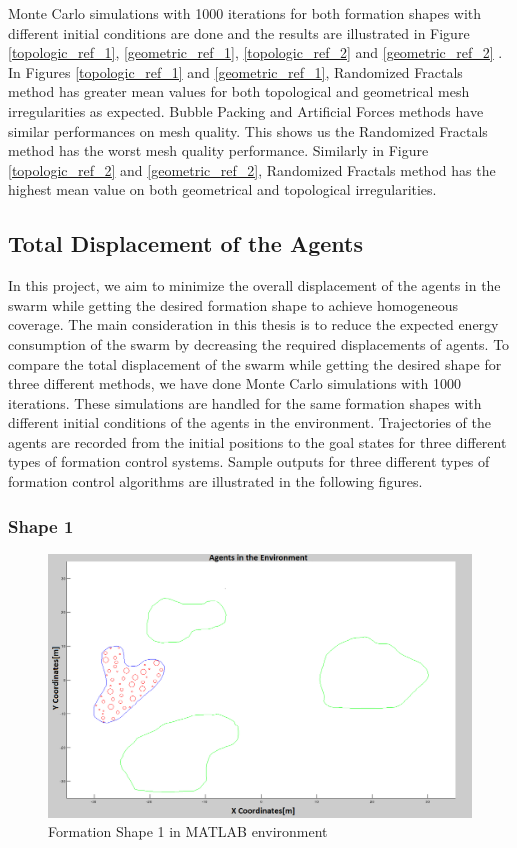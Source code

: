 Monte Carlo simulations with 1000 iterations for both formation shapes with different initial conditions are done and the results are illustrated in Figure \ref{topologic_ref_1}, \ref{geometric_ref_1}, \ref{topologic_ref_2} and \ref{geometric_ref_2} . In Figures \ref{topologic_ref_1} and \ref{geometric_ref_1}, Randomized Fractals method has greater mean values for both topological and geometrical mesh irregularities as expected.  Bubble Packing and Artificial Forces methods have similar performances on mesh quality. This shows us the Randomized Fractals method has the worst mesh quality performance. Similarly in Figure \ref{topologic_ref_2} and \ref{geometric_ref_2}, Randomized Fractals method has the highest mean value on both geometrical and topological irregularities.
		
\subsection{Total Displacement of the Agents}  \label{total_dist_ref}
		
In this project, we aim to minimize the overall displacement of the agents in the swarm while getting the desired formation shape to achieve homogeneous coverage. The main consideration in this thesis is to reduce the expected energy consumption of the swarm by decreasing the required displacements of agents. To compare the total displacement of the swarm while getting the desired shape for three different methods, we have done Monte Carlo simulations with 1000 iterations. These simulations are handled for the same formation shapes with different initial conditions of the agents in the environment. Trajectories of the agents are recorded from the initial positions to the goal states for three different types of formation control systems. Sample outputs for three different types of formation control algorithms are illustrated in the following figures.		

\subsubsection{Shape 1}\hspace{0pt}
		
\begin{figure}[H]
\caption{Formation Shape 1 in MATLAB environment}
\centerline{\includegraphics[scale = 0.27]{Trajectories_Formation_Shape_1_2}}
\end{figure} 	
			
